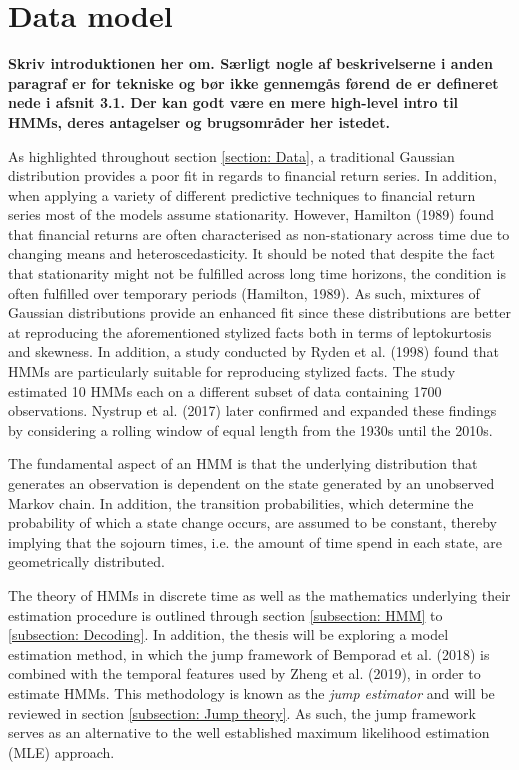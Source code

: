 \newpage
 \section{Data model}
 
 \textbf{Skriv introduktionen her om. Særligt nogle af beskrivelserne i anden paragraf er for tekniske og bør ikke gennemgås førend de er defineret nede i afsnit 3.1. Der kan godt være en mere high-level intro til HMMs, deres antagelser og brugsområder her istedet.}
 
As highlighted throughout section \ref{section: Data}, a traditional Gaussian distribution provides a poor fit in regards to financial return series. In addition, when applying a variety of different predictive techniques to financial return series most of the models assume stationarity. However, Hamilton (1989) found that financial returns are often characterised as non-stationary across time due to changing means and heteroscedasticity. It should be noted that despite the fact that stationarity might not be fulfilled across long time horizons, the condition is often fulfilled over temporary periods (Hamilton, 1989). As such, mixtures of Gaussian distributions provide an enhanced fit since these distributions are better at reproducing the aforementioned stylized facts both in terms of leptokurtosis and skewness. In addition, a study conducted by Ryden et al. (1998) found that HMMs are particularly suitable for reproducing stylized facts. The study estimated 10 HMMs each on a different subset of data containing 1700 observations. Nystrup et al. (2017) later confirmed and expanded these findings by considering a rolling window of equal length from the 1930s until the 2010s.

The fundamental aspect of an HMM is that the underlying distribution that generates an observation is dependent on the state generated by an unobserved Markov chain. In addition, the transition probabilities, which determine the probability of which a state change occurs, are assumed to be constant, thereby implying that the sojourn times, i.e. the amount of time spend in each state, are geometrically distributed.

The theory of HMMs in discrete time as well as the mathematics underlying their estimation procedure is outlined through section \ref{subsection: HMM} to \ref{subsection: Decoding}. In addition, the thesis will be exploring a model estimation method, in which the jump framework of Bemporad et al. (2018) is combined with the temporal features used by Zheng et al. (2019), in order to estimate HMMs. This methodology is known as the \textit{jump estimator} and will be reviewed in section \ref{subsection: Jump theory}. As such, the jump framework serves as an alternative to the well established maximum likelihood estimation (MLE) approach. 



